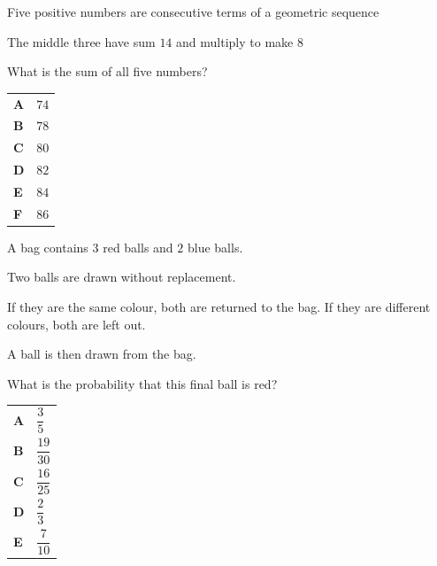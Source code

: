 \documentclass[11pt,a4paper]{article}
\begin{document}
\clearpage
\thispagestyle{djspaper}
\vspace*{8pt}
\begin{enumerate}[label=\textbf{\arabic*.},leftmargin=*,itemsep=0pt,start=8]
Five positive numbers are consecutive terms of a geometric sequence 

The middle three have sum $14$ and multiply to make $8$

What is the sum of all five numbers?

\par\vspace*{12pt}
\begin{tabularx}{\linewidth}{@{}>{\bfseries}l Y@{}}
A &
$74$
\\[0.8em]
B &
$78$
\\[0.8em]
C &
$80$
\\[0.8em]
D &
$82$
\\[0.8em]
E &
$84$
\\[0.8em]
F &
$86$
\\
\end{tabularx}
\end{enumerate}
\clearpage
\thispagestyle{djspaper}
\vspace*{8pt}
\begin{enumerate}[label=\textbf{\arabic*.},leftmargin=*,itemsep=0pt,start=9]
A bag contains $3$ red balls and $2$ blue balls. 

Two balls are drawn without replacement. 

If they are the same colour, both are returned to the bag. If they are different colours, both are left out.

A ball is then drawn from the bag.

What is the probability that this final ball is red?

\par\vspace*{12pt}
\begin{tabularx}{\linewidth}{@{}>{\bfseries}l Y@{}}
A &
$\dfrac{3}{5}$
\\[0.8em]
B &
$\dfrac{19}{30}$
\\[0.8em]
C &
$\dfrac{16}{25}$
\\[0.8em]
D &
$\dfrac{2}{3}$
\\[0.8em]
E &
$\dfrac{7}{10}$
\\
\end{tabularx}
\end{enumerate}
\end{document}
